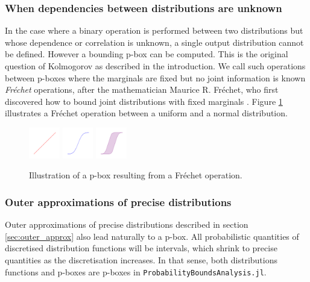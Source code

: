 \documentclass{juliacon}
\begin{document}
\subsubsection{When dependencies between distributions are unknown}
In the case where a binary operation is performed between two distributions but whose dependence or correlation is unknown, a single output distribution cannot be defined. However a bounding p-box can be computed. This is the original question of Kolmogorov as described in the introduction. We call such operations between p-boxes where the marginals are fixed but no joint information is known \textit{Fréchet} operations, after the mathematician Maurice R. Fréchet, who first discovered how to bound joint distributions with fixed marginals \cite{frechet1935generalisation}. Figure \ref{fig:figure5} illustrates a Fréchet operation between a uniform and a normal distribution.
\begin{figure}[htp]

  \centering
  \includegraphics[width=0.12\textwidth]{../examples/JuliaCon/fig5/fig5_dist1.pdf}
  \includegraphics[width=0.12\textwidth]{../examples/JuliaCon/fig5/fig5_dist2.pdf}
  \raisebox{9.0mm}{{\Large$\rightarrow$}}
  \includegraphics[width=0.12\textwidth]{../examples/JuliaCon/fig5/fig5_pbox.pdf}
  

  \caption{Illustration of a p-box resulting from a Fréchet operation.}
  \label{fig:figure5}
  
\end{figure}
\subsubsection{Outer approximations of precise distributions}
Outer approximations of precise distributions described in section \ref{sec:outer_approx} also lead naturally to a p-box. All probabilistic quantities of discretised distribution functions will be intervals, which shrink to precise quantities as the discretisation increases. In that sense, both distributions functions and p-boxes are p-boxes in \texttt{ProbabilityBoundsAnalysis.jl}.
\end{document}
